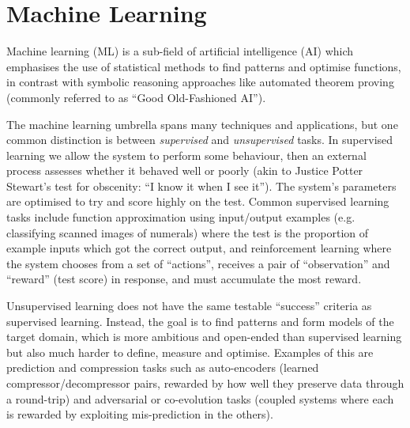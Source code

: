 \section{Machine Learning}

Machine learning (ML) is a sub-field of artificial intelligence (AI) which
emphasises the use of statistical methods to find patterns and optimise
functions, in contrast with symbolic reasoning approaches like automated theorem
proving (commonly referred to as ``Good Old-Fashioned AI'').

The machine learning umbrella spans many techniques and applications, but one
common distinction is between \emph{supervised} and \emph{unsupervised} tasks.
In supervised learning we allow the system to perform some behaviour, then an
external process assesses whether it behaved well or poorly (akin to Justice
Potter Stewart's test for obscenity: ``I know it when I see it''). The system's
parameters are optimised to try and score highly on the test. Common supervised
learning tasks include function approximation using input/output examples (e.g.
classifying scanned images of numerals) where the test is the proportion of
example inputs which got the correct output, and reinforcement learning where
the system chooses from a set of ``actions'', receives a pair of ``observation''
and ``reward'' (test score) in response, and must accumulate the most reward.

Unsupervised learning does not have the same testable ``success'' criteria as
supervised learning. Instead, the goal is to find patterns and form models of
the target domain, which is more ambitious and open-ended than supervised
learning but also much harder to define, measure and optimise. Examples of this
are prediction and compression tasks such as auto-encoders
(learned compressor/decompressor pairs, rewarded by how well they preserve data
through a round-trip) and adversarial or co-evolution tasks (coupled systems
where each is rewarded by exploiting mis-prediction in the others).


